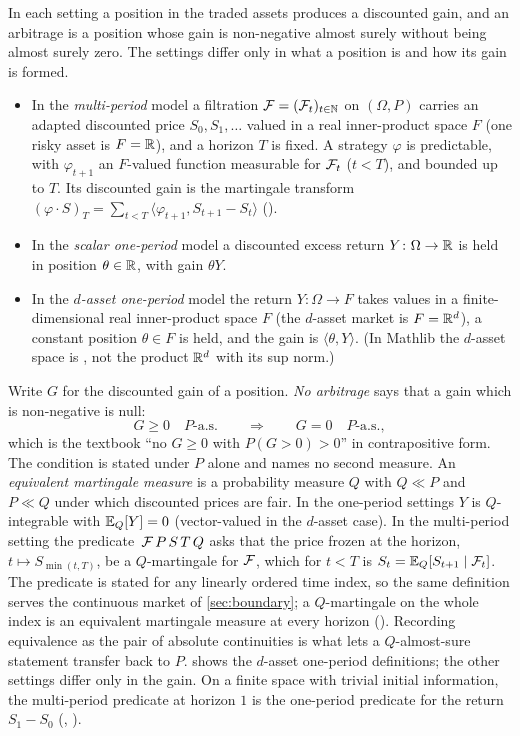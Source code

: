 \documentclass[11pt]{article}
\begin{document}
In each setting a position in the traded assets produces a discounted gain, and an arbitrage is a
position whose gain is non-negative almost surely without being almost surely zero. The settings differ
only in what a position is and how its gain is formed.
\begin{itemize}
\item In the \emph{multi-period} model a filtration $\mathcal{F}=(\mathcal{F}_t)_{t\in\mathbb{N}}$ on $(\Omega,P)$ carries an
  adapted discounted price $S_0,S_1,\dots$ valued in a real inner-product space $F$ (one risky asset is
  $F=\mathbb{R}$), and a horizon $T$ is fixed. A strategy $\varphi$ is predictable, with $\varphi_{t+1}$ an
  $F$-valued function measurable for $\mathcal{F}_t$ ($t<T$), and bounded up to $T$. Its discounted gain is the martingale
  transform $(\varphi\cdot S)_T=\sum_{t<T}\langle\varphi_{t+1},S_{t+1}-S_t\rangle$
  ().
\item In the \emph{scalar one-period} model a discounted excess return $Y\colon\Omega\to\mathbb{R}$ is held in
  position $\theta\in\mathbb{R}$, with gain $\theta Y$.
\item In the \emph{$d$-asset one-period} model the return $Y\colon\Omega\to F$ takes values in a
  finite-dimensional real inner-product space $F$ (the $d$-asset market is $F=\mathbb{R}^d$), a constant
  position $\theta\in F$ is held, and the gain is $\langle\theta,Y\rangle$. (In Mathlib the $d$-asset
  space is , not the product $\mathbb{R}^d$ with its sup norm.)
\end{itemize}
Write $G$ for the discounted gain of a position. \emph{No arbitrage} says that a gain which is
non-negative is null:
\[
  G\ge 0 \quad P\text{-a.s.} \qquad\Longrightarrow\qquad G=0\quad P\text{-a.s.},
\]
which is the textbook ``no $G\ge0$ with $P(G>0)>0$'' in contrapositive form. The condition is stated
under $P$ alone and names no second measure. An \emph{equivalent martingale measure} is a probability
measure $Q$ with $Q\ll P$ and $P\ll Q$ under which discounted prices are fair. In the one-period
settings $Y$ is $Q$-integrable with $\mathbb{E}_Q[Y]=0$ (vector-valued in the $d$-asset case). In the
multi-period setting the predicate \,$\mathcal{F}\,P\,S\,T\,Q$ asks that the price frozen at the horizon,
$t\mapsto S_{\min(t,T)}$, be a $Q$-martingale for $\mathcal{F}$, which for $t<T$ is
$S_t=\mathbb{E}_Q[S_{t+1}\mid\mathcal{F}_t]$. The predicate is stated for any linearly ordered time index, so the same
definition serves the continuous market of \cref{sec:boundary}; a $Q$-martingale on the whole index is an
equivalent martingale measure at every horizon (). Recording equivalence as the
pair of absolute continuities is what lets a $Q$-almost-sure statement transfer back to $P$.
 shows the $d$-asset one-period definitions; the other settings differ only in the gain. On a
finite space with trivial initial information, the multi-period predicate at horizon $1$ is the
one-period predicate for the return $S_1-S_0$ (,
).
\end{document}

